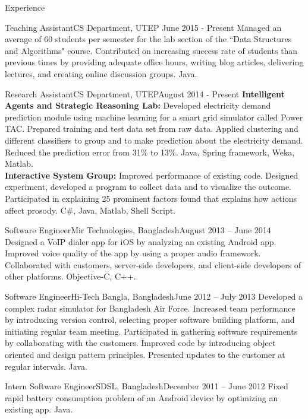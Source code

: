 \documentclass[]{mcdowellcv}
\begin{document}
	\begin{cvsection}{Experience}
		
		\begin{cvsubsection}{Teaching Assistant}{CS Department, UTEP }{June 2015 - Present}
			Managed an average of 60 students per semester for the lab section of the ``Data Structures and Algorithms" course. Contributed on increasing success rate of students than previous times by providing adequate office hours, writing blog articles, delivering lectures, and creating online discussion groups. Java.
		\end{cvsubsection}
		
		\begin{cvsubsection}{Research Assistant}{CS Department, UTEP}{August 2014 - Present}
			\textbf{Intelligent Agents and Strategic Reasoning Lab:} Developed electricity demand prediction module using machine learning for a smart grid simulator called Power TAC. Prepared training and test data set from raw data. Applied clustering and different classifiers to group and to make prediction about the electricity demand. Reduced the prediction error from 31\% to 13\%. Java, Spring framework, Weka, Matlab.\\ 
			\textbf{Interactive System Group:} Improved performance of existing code. Designed experiment, developed a program to collect data and to visualize the outcome. Participated in explaining 25 prominent factors found that explains how actions affect prosody. C\#, Java, Matlab, Shell Script.
		\end{cvsubsection}		
		
		\begin{cvsubsection}{Software Engineer}{Mir Technologies, Bangladesh}{August 2013 -- June 2014}
		Designed a VoIP dialer app for iOS by analyzing an existing Android app. Improved voice quality of the app by using a proper audio framework. Collaborated with customers, server-side developers, and client-side developers of other platforms. Objective-C, C++.
\end{cvsubsection}		
		\begin{cvsubsection}{Software Engineer}{Hi-Tech Bangla, Bangladesh}{June 2012 -- July 2013}	
Developed a complex radar simulator for Bangladesh Air Force. Increased team performance by introducing version control, selecting proper software building platform, and initiating regular team meeting. Participated in gathering software requirements by collaborating with the customers. Improved code by introducing object oriented and design pattern principles. Presented updates to the customer at regular intervals. Java.
		\end{cvsubsection}
		
		\begin{cvsubsection}{Intern Software Engineer}{SDSL, Bangladesh}{December 2011 -- June 2012}	
			Fixed rapid battery consumption problem of an Android device by optimizing an existing app. Java.
		\end{cvsubsection}		
	\end{cvsection}
	
\end{document}

